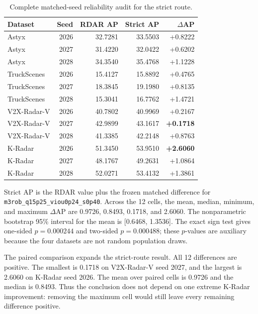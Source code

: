 \documentclass[final,5p,times]{elsarticle}
\newcommand{\reviewcaption}[1]{\caption{\textcolor{floatreviewblue}{#1}}}
\newcommand{\reviewcaption}[1]{\caption{#1}}
\begin{document}
\begin{table}[!t]
\centering
\reviewcaption{Complete matched-seed reliability audit for the strict route.}
\label{tab:paired-results}
\begingroup
\color{black}
\scriptsize
\setlength{\tabcolsep}{3pt}
\renewcommand{\arraystretch}{1.14}
\begin{tabularx}{\columnwidth}{@{}Xrrrr@{}}
\toprule
Dataset & Seed & RDAR AP & Strict AP & $\Delta$AP \\
\midrule
Astyx & 2026 & 32.7281 & 33.5503 & +0.8222 \\
Astyx & 2027 & 31.4220 & 32.0422 & +0.6202 \\
Astyx & 2028 & 34.3540 & 35.4768 & +1.1228 \\
\addlinespace
TruckScenes & 2026 & 15.4127 & 15.8892 & +0.4765 \\
TruckScenes & 2027 & 18.3845 & 19.1980 & +0.8135 \\
TruckScenes & 2028 & 15.3041 & 16.7762 & +1.4721 \\
\addlinespace
V2X-Radar-V & 2026 & 40.7802 & 40.9969 & +0.2167 \\
V2X-Radar-V & 2027 & 42.9899 & 43.1617 & \textbf{+0.1718} \\
V2X-Radar-V & 2028 & 41.3385 & 42.2148 & +0.8763 \\
\addlinespace
K-Radar & 2026 & 51.3450 & 53.9510 & \textbf{+2.6060} \\
K-Radar & 2027 & 48.1767 & 49.2631 & +1.0864 \\
K-Radar & 2028 & 52.0271 & 53.4132 & +1.3861 \\
\bottomrule
\end{tabularx}
\endgroup
\vspace{2pt}
\parbox{\columnwidth}{\scriptsize
Strict AP is the RDAR value plus the frozen matched difference for
\texttt{m3rob\_q15p25\_viou0p24\_s0p40}. Across the 12 cells, the mean,
median, minimum, and maximum $\Delta$AP are 0.9726, 0.8493, 0.1718, and
2.6060. The nonparametric bootstrap 95\% interval for the mean is
[0.6468, 1.3536]. The exact sign test gives one-sided
$p=0.000244$ and two-sided $p=0.000488$; these $p$-values are auxiliary
because the four datasets are not random population draws.}
\end{table}

The paired comparison expands the strict-route result. All 12 differences are
positive. The smallest is 0.1718
on V2X-Radar-V seed 2027, and the largest is 2.6060 on K-Radar seed 2026. The
mean over paired cells is 0.9726 and the median is 0.8493. Thus the conclusion
does not depend on one extreme K-Radar improvement: removing the maximum cell
would still leave every remaining difference positive.
\end{document}
